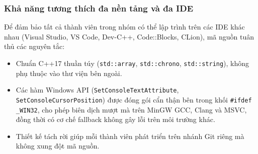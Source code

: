 \subsubsection{Khả năng tương thích đa nền tảng và đa IDE}
Để đảm bảo tất cả thành viên trong nhóm có thể lập trình trên các IDE khác nhau (Visual Studio, VS Code, Dev-C++, Code::Blocks, CLion), mã nguồn tuân thủ các nguyên tắc:
\begin{itemize}
  \item Chuẩn C++17 thuần túy (\texttt{std::array}, \texttt{std::chrono}, \texttt{std::string}), không phụ thuộc vào thư viện bên ngoài.
  \item Các hàm Windows API (\texttt{SetConsoleTextAttribute}, \texttt{SetConsoleCursorPosition}) được đóng gói cẩn thận bên trong khối \texttt{\#ifdef \_WIN32}, cho phép biên dịch mượt mà trên MinGW GCC, Clang và MSVC, đồng thời có cơ chế fallback không gây lỗi trên môi trường khác.
  \item Thiết kế tách rời giúp mỗi thành viên phát triển trên nhánh Git riêng mà không xung đột mã nguồn.
\end{itemize}

